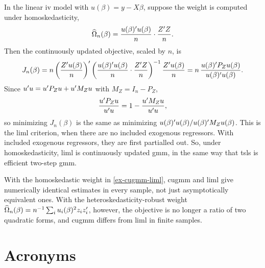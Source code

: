 \documentclass[a4paper,12pt]{article}
\begin{document}
\begin{example}\label{ex-cugmm-liml}
	In the linear \gls{iv} model with $u(\beta)=y-X\beta$, suppose the weight is computed under homoskedasticity,
	\begin{align*}
		\widehat\Omega_n(\beta)=\frac{u(\beta)^{\prime} u(\beta)}{n}\cdot\frac{Z^{\prime} Z}{n}.
	\end{align*}
	Then the continuously updated objective, scaled by $n$, is
	\begin{align*}
		J_n(\beta)
		=n\left(\frac{Z^{\prime} u(\beta)}{n}\right)^{\prime}\left(\frac{u(\beta)^{\prime} u(\beta)}{n}\cdot\frac{Z^{\prime} Z}{n}\right)^{-1}\frac{Z^{\prime} u(\beta)}{n}
		=n\,\frac{u(\beta)^{\prime} P_Zu(\beta)}{u(\beta)^{\prime} u(\beta)}.
	\end{align*}
	Since $u^{\prime} u=u^{\prime} P_Zu+u^{\prime} M_Zu$ with $M_Z=I_n-P_Z$,
	\begin{align*}
		\frac{u^{\prime} P_Zu}{u^{\prime} u}=1-\frac{u^{\prime} M_Zu}{u^{\prime} u},
	\end{align*}
	so minimizing $J_n(\beta)$ is the same as minimizing $u(\beta)^{\prime} u(\beta)/u(\beta)^{\prime} M_Zu(\beta)$.
	This is the \gls{liml} criterion, when there are no included exogenous regressors.
	With included exogenous regressors, they are first partialled out.
	So, under homoskedasticity, \gls{liml} is continuously updated \gls{gmm},
	in the same way that \gls{tsls} is efficient two-step \gls{gmm}.
\end{example}

\begin{remark}
	With the homoskedastic weight in \autoref{ex-cugmm-liml}, \gls{cugmm} and \gls{liml} give numerically identical estimates in every sample, not just asymptotically equivalent ones.
	With the heteroskedasticity-robust weight $\widehat\Omega_n(\beta)=n^{-1}\sum_iu_i(\beta)^2z_iz_i^{\prime}$, however,
	the objective is no longer a ratio of two quadratic forms, and \gls{cugmm} differs from \gls{liml} in finite samples.
\end{remark}

\vfill
\section*{Acronyms}
\printglossaries

{\sloppy\printbibliography[heading=bibintoc,title={References}]}
\end{document}
